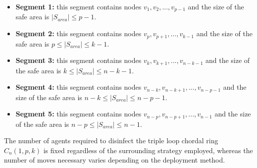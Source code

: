 \begin{itemize}

\item {\bf Segment 1:}  this segment contains nodes $v_1,v_2,...,v_{p-1}$ and the size of the safe area is $ |S_{area}| \leq p-1$.
\item {\bf Segment 2:}  this segment contains nodes $v_p,v_{p+1},...,v_{k-1}$ and the size of the safe area is $p \leq |S_{area}| \leq k-1$.
\item {\bf Segment 3:} this segment contains nodes $v_k,v_{k+1},...,v_{n-k-1}$ and the size of the safe area is $k \leq |S_{area}| \leq n-k-1$.
\item {\bf Segment 4:} this segment contains nodes $v_{n-k},v_{n-k+1},...,v_{n-p-1}$ and the size of the safe area is $n-k \leq |S_{area}| \leq n-p-1$.
\item {\bf Segment 5:}   this segment contains nodes $v_{n-p},v_{n-p+1},...,v_{n-1}$ and the size of the safe area is $n-p \leq |S_{area}| \leq n-1$.
\end{itemize}



The number of agents required to disinfect the triple loop chordal ring $C_n(1,p,k)$ is fixed regardless of  the surrounding strategy employed, whereas the number of moves necessary varies depending on the deployment method.


